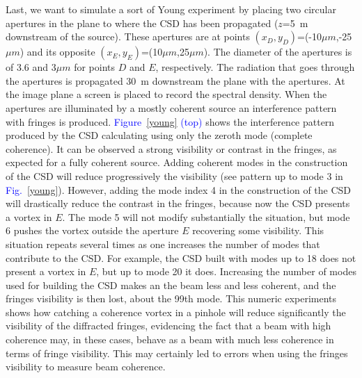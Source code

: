 \documentclass[%
 reprint,
 amsmath,amssymb,
 aps,
]{revtex4-1}
\begin{document}
Last, we want to simulate a sort of Young experiment by placing two circular apertures in the plane to where the CSD has been propagated ($z$=5~m downstream of the source). These apertures are at points $(x_D,y_D)$=(-10$\mu m$,-25$\mu m$) and its opposite $(x_E,y_E)$=(10$\mu m$,25$\mu m$). The diameter of the apertures is of 3.6 and 3$\mu m$ for points $D$ and $E$, respectively. The radiation that goes through the apertures is propagated 30~m downstream the plane with the apertures. At the image plane a screen is placed to record the spectral density. When the apertures are illuminated by a mostly coherent source an interference pattern with fringes is produced. \textcolor{blue}{Figure~\ref{young} (top)}  shows the interference pattern produced by the CSD calculating using only the zeroth mode (complete coherence). It can be observed a strong visibility or contrast in the fringes, as expected for a  fully coherent source. Adding coherent modes in the construction of the CSD will reduce progressively the visibility (see pattern up to mode 3 in \textcolor{blue}{Fig.~\ref{young}}). However, adding the mode index 4 in the construction of the CSD will drastically reduce the contrast in the fringes, because now the CSD presents a vortex in $E$. The mode 5 will not modify substantially the situation, but mode 6 pushes the vortex outside the aperture $E$ recovering some visibility. This situation repeats several times as one increases the number of modes that contribute to the CSD. For example, the CSD built with modes up to 18 does not present a vortex in $E$, but up to mode 20 it does. Increasing the number of modes used for building the CSD makes an the beam less and less coherent, and the fringes visibility is then lost, about the 99th mode. This numeric experiments shows how catching a coherence vortex in a pinhole will reduce significantly the visibility of the diffracted fringes, evidencing the fact that a beam with high coherence may, in these cases, behave as a beam with much less coherence in terms of fringe visibility. This may certainly led to errors when using the fringes visibility to measure beam coherence.  
\end{document}
